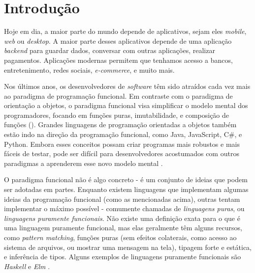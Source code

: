 
\chapter{Introdução}

Hoje em dia, a maior parte do mundo depende de aplicativos, sejam eles \textit{mobile},
\textit{web} ou \textit{desktop}. A maior parte desses aplicativos depende de uma aplicação
\textit{backend} para guardar dados, conversar com outras aplicações, realizar
pagamentos. Aplicações modernas permitem que tenhamos acesso a bancos, entretenimento,
redes sociais, \textit{e-commerce}, e muito mais.

Nos últimos anos, os desenvolvedores de \textit{software} têm sido atraídos cada vez mais
ao paradigma de programação funcional. Em contraste com o paradigma de orientação
a objetos, o paradigma funcional visa simplificar o modelo mental dos programadores,
focando em funções puras, imutabilidade, e composição de funções (\textcite{functionalprogramming-future}).
Grandes linguagens de programação orientadas a objetos também estão indo na direção
da programação funcional, como Java, JavaScript, C\#, e Python. Embora esses
conceitos possam criar programas mais robustos e mais fáceis de testar, pode ser
difícil para desenvolvedores acostumados com outros paradigmas a aprenderem esse
novo modelo mental \cite{promisesoffp}.

O paradigma funcional não é algo concreto - é um conjunto de ideias que podem ser
adotadas em partes. Enquanto existem linguagens que implementam
algumas ideias da programação funcional (como as mencionadas acima), outras
tentam implementar o máximo possível - comumente chamadas de \textit{linguagens puras},
ou \textit{linguagens puramente funcionais}. Não existe uma definição exata para
o que é uma linguagem puramente funcional, mas elas geralmente têm alguns recursos,
como \textit{pattern matching}, funções puras (sem efeitos colaterais, como acesso
ao sistema de arquivos, ou mostrar uma mensagem na tela), tipagem forte e estática,
e inferência de tipos. Alguns exemplos de linguagens puramente funcionais são
\textit{Haskell} \cite{conceptionoffunctionalpl} e \textit{Elm} \cite{czaplicki2012elm}.

